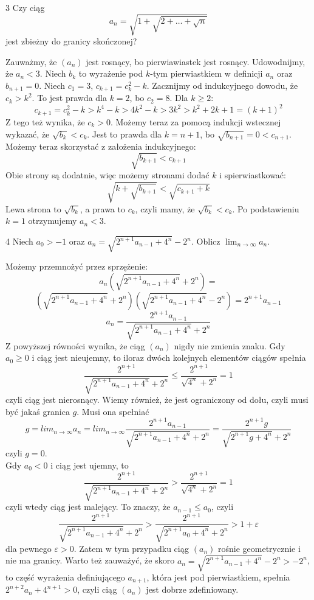 \documentclass{../note}
\begin{document}
\begin{zadanie}{3}
Czy ciąg \[ a_{n}=\sqrt{1+\sqrt{2+\dots+\sqrt{n}}} \] jest zbieżny do granicy skończonej?
\end{zadanie}
\begin{rozwiazanie}
Zauważmy, że $(a_n)$ jest rosnący, bo pierwiawiastek jest rosnący. Udowodnijmy, że $a_n < 3$. Niech $b_k$ to wyrażenie pod $k$-tym pierwiastkiem w definicji $a_n$ oraz $b_{n+1} = 0$. Niech $c_1 = 3$, $c_{k+1} = c_k^2 - k$. Zacznijmy od indukcyjnego dowodu, że $c_k > k^2$. To jest prawda dla $k=2$, bo $c_2 = 8$. Dla $k \geq 2$:
\[c_{k+1} = c_k^2 - k > k^4 - k > 4k^2 - k > 3k^2 > k^2 + 2k + 1 = (k + 1)^2\]
Z tego też wynika, że $c_k > 0$. Możemy teraz za pomocą indukcji wstecznej wykazać, że $\sqrt{b_k} < c_k$. Jest to prawda dla $k = n + 1$, bo $\sqrt{b_{n+1}} = 0 < c_{n+1}$. Możemy teraz skorzystać z założenia indukcyjnego:
\[\sqrt{b_{k+1}} < c_{k+1}\]
Obie strony są dodatnie, więc możemy stronami dodać $k$ i spierwiastkować:
\[\sqrt{k + \sqrt{b_{k+1}}} < \sqrt{c_{k+1} + k}\]
Lewa strona to $\sqrt{b_k}$, a prawa to $c_k$, czyli mamy, że $\sqrt{b_k} < c_k$. Po podstawieniu $k = 1$ otrzymujemy $a_n < 3$.
\end{rozwiazanie}

\begin{zadanie}{4}
Niech $a_{0}>-1$ oraz $ a_{n}=\sqrt{2^{n+1}a_{n-1}+4^{n}}-2^{n} $. Oblicz $ \lim_{n\rightarrow\infty}a_{n} $.
\end{zadanie}
\begin{rozwiazanie}
Możemy przemnożyć przez sprzężenie:
\[a_n\left(\sqrt{2^{n+1}a_{n-1}+4^{n}}+2^{n}\right) =\]
\[\left(\sqrt{2^{n+1}a_{n-1}+4^{n}}+2^{n}\right)\left(\sqrt{2^{n+1}a_{n-1}+4^{n}}-2^{n}\right) = 2^{n+1}a_{n-1}\]
\[a_n = \frac{2^{n+1}a_{n-1}}{\sqrt{2^{n+1}a_{n-1}+4^{n}}+2^{n}}\]
Z powyższej równości wynika, że ciąg $(a_n)$ nigdy nie zmienia znaku. Gdy $a_0 \geq 0$ i ciąg jest nieujemny, to iloraz dwóch kolejnych elementów ciągów spełnia
\[\frac{2^{n+1}}{\sqrt{2^{n+1}a_{n-1}+4^{n}}+2^{n}} \leq \frac{2^{n+1}}{\sqrt{4^{n}}+2^{n}} = 1\]
czyli ciąg jest nierosnący. Wiemy również, że jest ograniczony od dołu, czyli musi być jakaś granica $g$. Musi ona spełniać
\[g = lim_{n\to\infty} a_n = lim_{n\to\infty} \frac{2^{n+1}a_{n-1}}{\sqrt{2^{n+1}a_{n-1}+4^{n}}+2^{n}} = \frac{2^{n+1}g}{\sqrt{2^{n+1}g+4^{n}}+2^{n}}\]
czyli $g = 0$.\\
Gdy $a_0 < 0$ i ciąg jest ujemny, to
\[\frac{2^{n+1}}{\sqrt{2^{n+1}a_{n-1}+4^{n}}+2^{n}} > \frac{2^{n+1}}{\sqrt{4^{n}}+2^{n}} = 1\]
czyli wtedy ciąg jest malejący. To znaczy, że $a_{n-1} \leq a_0$, czyli
\[\frac{2^{n+1}}{\sqrt{2^{n+1}a_{n-1}+4^{n}}+2^{n}} > \frac{2^{n+1}}{\sqrt{2^{n+1}a_0+4^{n}}+2^{n}} > 1 + \varepsilon\]
dla pewnego $\varepsilon > 0$. Zatem w tym przypadku ciąg $(a_n)$ rośnie geometrycznie i nie ma granicy. Warto też zauważyć, że skoro $a_n = \sqrt{2^{n+1}a_{n-1}+4^{n}}-2^{n} > -2^n$, to część wyrażenia definiującego $a_{n+1}$, która jest pod pierwiastkiem, spełnia $2^{n+2}a_{n}+4^{n+1} > 0$, czyli ciąg $(a_n)$ jest dobrze zdefiniowany.
\end{rozwiazanie}
\end{document}
